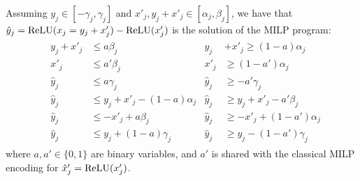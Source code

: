 \begin{proposition}
	\label{Prop4}
	Assuming $y_j \in [-\gamma_j, \gamma_j]$ and $x'_j,y_j+x'_j \in [\alpha_j,\beta_j]$, we have that $\hat{y}_j = \mathrm{ReLU}(x_j=y_j + x'_j) - \mathrm{ReLU}(x'_j)$ is the solution of the MILP program:
	\begin{align*}
		& \begin{aligned}
			y_j + x'_j &\leq a\beta_j        &
			y_j &+ x'_j \geq (1-a)\alpha_j \\
			x'_j       &\leq a'\beta_j       & 
			x'_j       &\geq (1-a')\alpha_j \\
			\hat{y}_j  &\leq a\gamma_j       &
			\hat{y}_j  &\geq -a'\gamma_j \\
			\hat{y}_j  &\leq y_j + x'_j - (1-a)\alpha_j &
			\hat{y}_j  &\geq y_j + x'_j - a'\beta_j \\
			\hat{y}_j  &\leq -x'_j + a\beta_j &
			\hat{y}_j  &\geq -x'_j + (1-a')\alpha_j \\
			\hat{y}_j  &\leq y_j + (1-a)\gamma_j  &
			\hat{y}_j  &\geq y_j - (1-a')\gamma_j
		\end{aligned}
	\end{align*} 
	where $a,a' \in \{0,1\}$ are binary variables, 
	and $a'$ is shared with the classical MILP
	encoding for $\hat{x}'_j=\mathrm{ReLU}(x'_j)$.
\end{proposition}

